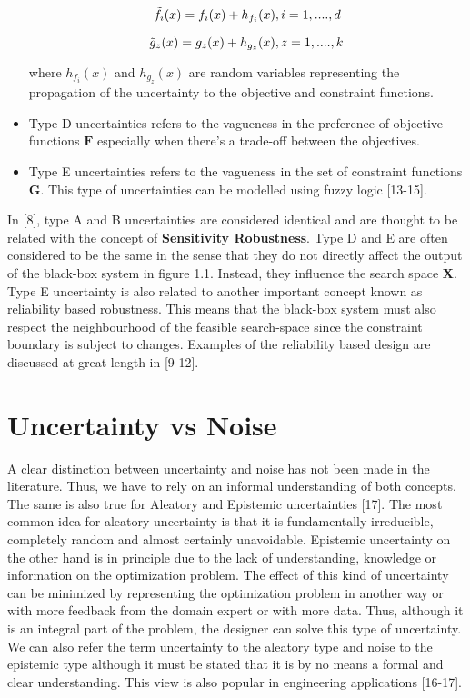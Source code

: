 \begin{itemize}
	\begin{equation}
    \Tilde{f}_i(x) = {f}_i(x)+h_{{f}_i}(x) , i=1,....,d
    \end{equation} 
    
    \begin{equation}
    \Tilde{g}_z(x) = {g}_z(x)+h_{{g}_z}(x), z=1,....,k
    \end{equation} 
    
    where $h_{{f}_i}(x)$ and $h_{{g}_z}(x)$ are random variables representing the propagation of the uncertainty to the objective and constraint functions.  
	\item Type D uncertainties refers to the vagueness in the preference of objective functions $ \textbf{F}$ especially when there's a trade-off between the objectives.
	\item Type E uncertainties refers to the vagueness in the set of constraint functions $ \textbf{G}$. This type of uncertainties can be modelled using fuzzy logic [13-15].
	
\end{itemize}

In [8], type A and B uncertainties are considered identical and are thought to be related with the concept of \textbf{Sensitivity Robustness}. Type D and E are often considered to be the same in the sense that they do not directly affect the output of the black-box system in figure 1.1. Instead, they influence the search space \textbf{X}. Type E uncertainty is also related to another important concept known as reliability based robustness. This means that the black-box system must also respect the neighbourhood of the feasible search-space since the constraint boundary is subject to changes. Examples of the reliability based design are discussed at great length in [9-12]. 

\section{Uncertainty vs Noise}

A clear distinction between uncertainty and noise has not been made in the literature. Thus, we have to rely on an informal understanding of both concepts. The same is also true for Aleatory and Epistemic uncertainties [17]. The most common idea for aleatory uncertainty is that it is fundamentally irreducible, completely random and almost certainly unavoidable. Epistemic uncertainty on the other hand is in principle due to the lack of understanding, knowledge or information on the optimization problem. The effect of this kind of uncertainty can be minimized by representing the optimization problem in another way or with more feedback from the domain expert or with more data. Thus, although it is an integral part of the problem, the designer can solve this type of uncertainty. We can also refer the term uncertainty to the aleatory type and noise to the epistemic type although it must be stated that it is by no means a formal and clear understanding. This view is also popular in engineering applications [16-17].

